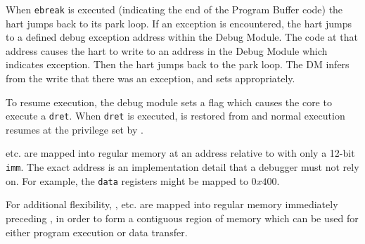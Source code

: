 When {\tt ebreak} is executed (indicating the end of the
Program Buffer code) the hart jumps back to its park loop. If an exception is
encountered, the hart jumps to a defined debug exception address within
the Debug Module. The code at that address causes the hart to
write to an address in the Debug Module which indicates exception.
Then the hart jumps back to the park loop.
The DM infers from the write that there was an exception, and sets \Fcmderr appropriately.

To resume execution, the debug module sets a flag which causes the core to execute a {\tt dret}.
When {\tt dret} is executed, \Rpc is restored from \Rdpc and normal execution resumes at the
privilege set by \Fprv.

\Rdatazero etc. are mapped into regular memory at an address relative to \Rzero
with only a 12-bit {\tt imm}. The exact address is an implementation
detail that a debugger must not rely on. For example, the {\tt data}
registers might be mapped to $0x400$.

For additional flexibility, \Rprogrambufferzero, etc. are mapped into regular memory
immediately preceding \Rdatazero, in order to form a contiguous region of memory which
can be used for either program execution or data transfer.
